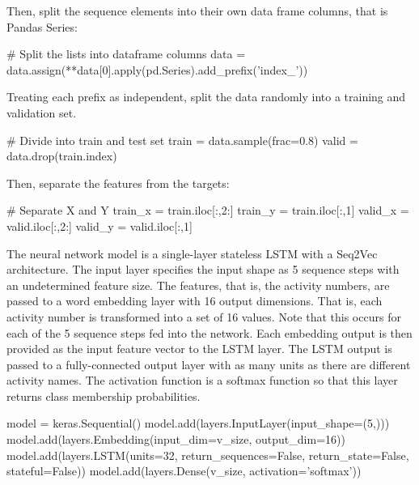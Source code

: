 Then, split the sequence elements into their own data frame columns, that is Pandas Series:

\begin{samepage}
\begin{pythoncode}
# Split the lists into dataframe columns
data = data.assign(**data[0].apply(pd.Series).add_prefix('index_'))
\end{pythoncode}
\end{samepage}

Treating each prefix as independent, split the data randomly into a training and validation set. 

\begin{samepage}
\begin{pythoncode}
# Divide into train and test set
train = data.sample(frac=0.8)
valid = data.drop(train.index)
\end{pythoncode}
\end{samepage}

Then, separate the features from the targets:

\begin{samepage}
\begin{pythoncode}
# Separate X and Y
train_x = train.iloc[:,2:]
train_y = train.iloc[:,1]
valid_x = valid.iloc[:,2:]
valid_y = valid.iloc[:,1]
\end{pythoncode}
\end{samepage}

The neural network model is a single-layer stateless LSTM with a Seq2Vec architecture. The input layer specifies the input shape as 5 sequence steps with an undetermined feature size. The features, that is, the activity numbers, are passed to a word embedding layer with 16 output dimensions. That is, each activity number is transformed into a set of 16 values. Note that this occurs for each of the 5 sequence steps fed into the network. Each embedding output is then provided as the input feature vector to the LSTM layer. The LSTM output is passed to a fully-connected output layer with as many units as there are different activity names. The activation function is a softmax function so that this layer returns class membership probabilities. 

\begin{samepage}
\begin{pythoncode}
model = keras.Sequential()
model.add(layers.InputLayer(input_shape=(5,)))
model.add(layers.Embedding(input_dim=v_size, output_dim=16))
model.add(layers.LSTM(units=32,
    return_sequences=False, return_state=False, stateful=False))
model.add(layers.Dense(v_size, activation='softmax'))
\end{pythoncode}
\end{samepage}


